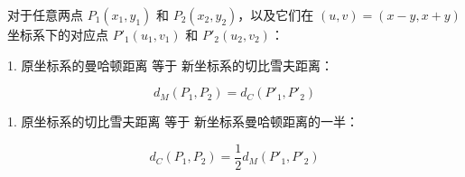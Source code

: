 对于任意两点 $P_1(x_1,y_1)$ 和 $P_2(x_2,y_2)$，以及它们在 $(u,v)=(x-y,x+y)$ 坐标系下的对应点 $P'_1(u_1,v_1)$ 和 $P'_2(u_2,v_2)$：
 
1. 原坐标系的曼哈顿距离 等于 新坐标系的切比雪夫距离：
 
$$
d_M(P_1,P_2) = d_C(P'_1,P'_2)
$$

1. 原坐标系的切比雪夫距离 等于 新坐标系曼哈顿距离的一半：
 
$$
d_C(P_1,P_2) = \frac{1}{2}d_M(P'_1,P'_2)
$$
